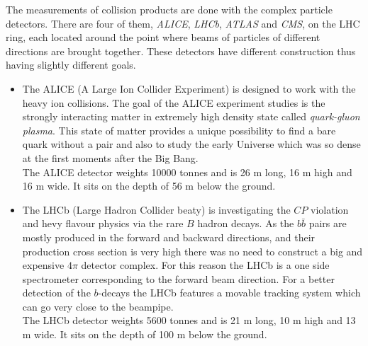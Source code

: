 
The measurements of collision products are done with the complex particle detectors. There are four of them, 
\textit{ALICE}, \textit{LHCb}, \textit{ATLAS} and \textit{CMS}, on the LHC
ring, each located around the point where beams of particles of different directions are brought together.
These detectors have different construction thus having slightly different goals.

\begin{itemize}
 \item The ALICE (A Large Ion Collider Experiment)\cite{ALICEtdr} is designed to
 work with the heavy ion collisions. The goal of the ALICE experiment studies is
 the strongly interacting matter in extremely high density state called \textit{quark-gluon plasma}. This 
 state of matter provides a unique possibility to find a bare quark without a pair and also to study the early
 Universe which was so dense at the first moments after the Big Bang.
 \\
 The ALICE detector weights 10000 tonnes and is 26 m long, 16 m high and 16 m wide. It sits on the depth of
 56 m below the ground.
 
 \item The LHCb (Large Hadron Collider beaty)\cite{LHCb} is investigating the $CP$ violation and hevy flavour physics via
 the rare $B$ hadron decays. As the $b\bar{b}$ pairs are mostly produced in the forward and backward directions, 
 and their production cross section is very high there was no need to construct a big and expensive $4\pi$ detector 
 complex. For this reason the LHCb is a one side spectrometer corresponding to the forward beam direction.
 For a better detection of the $b$-decays the LHCb features a movable tracking system which can go very close
 to the beampipe.
 \\
 The LHCb detector weights 5600 tonnes and is 21 m long, 10 m high and 13 m wide. It sits on the depth of 100 m 
 below the ground.
 
 
 
\end{itemize}


